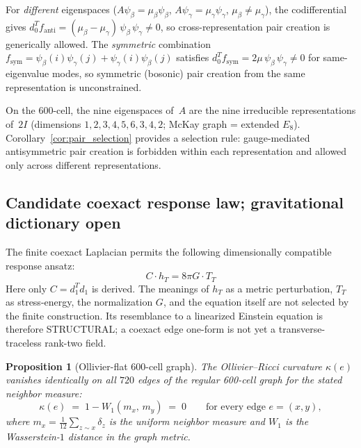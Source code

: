 \documentclass[12pt,a4paper]{article}
\newtheorem{proposition}{Proposition}
\theoremstyle{definition}
\begin{document}
For \emph{different} eigenspaces ($A\psi_\beta = \mu_\beta \psi_\beta$, $A\psi_\gamma = \mu_\gamma \psi_\gamma$, $\mu_\beta \neq \mu_\gamma$), the codifferential gives $d_0^T f_{\mathrm{anti}} = (\mu_\beta - \mu_\gamma)\,\psi_\beta\,\psi_\gamma \neq 0$, so cross-representation pair creation is generically allowed. The \emph{symmetric} combination $f_{\mathrm{sym}} = \psi_\beta(i)\psi_\gamma(j) + \psi_\gamma(i)\psi_\beta(j)$ satisfies $d_0^T f_{\mathrm{sym}} = 2\mu\,\psi_\beta\,\psi_\gamma \neq 0$ for same-eigenvalue modes, so symmetric (bosonic) pair creation from the same representation is unconstrained.

On the 600-cell, the nine eigenspaces of~$A$ are the nine irreducible representations of~$2I$ (dimensions $1, 2, 3, 4, 5, 6, 3, 4, 2$; McKay graph = extended $E_8$). Corollary~\ref{cor:pair_selection} provides a selection rule: gauge-mediated antisymmetric pair creation is forbidden within each representation and allowed only across different representations.

\subsection{Candidate coexact response law; gravitational dictionary open}

The finite coexact Laplacian permits the following dimensionally compatible response ansatz:
\begin{equation}
\boxed{C \cdot h_T = 8\pi G \cdot T_T}
\label{eq:gravity}
\end{equation}
Here only $C=d_1^Td_1$ is derived.  The meanings of $h_T$ as a metric perturbation, $T_T$ as stress-energy, the normalization $G$, and the equation itself are not selected by the finite construction.  Its resemblance to a linearized Einstein equation is therefore STRUCTURAL; a coexact edge one-form is not yet a transverse-traceless rank-two field.

\begin{proposition}[Ollivier-flat 600-cell graph]
\label{prop:ricci_flat}
The Ollivier--Ricci curvature $\kappa(e)$ vanishes identically on all\/ $720$ edges of the regular 600-cell graph for the stated neighbor measure:
\begin{equation}
\kappa(e) \;=\; 1 - W_1(m_x,\, m_y) \;=\; 0 \qquad \text{for every edge } e = (x,y),
\label{eq:ollivier_flat}
\end{equation}
where $m_x = \frac{1}{12}\sum_{z \sim x}\delta_z$ is the uniform neighbor measure and\/ $W_1$ is the Wasserstein-$1$ distance in the graph metric.
\end{proposition}
\end{document}
